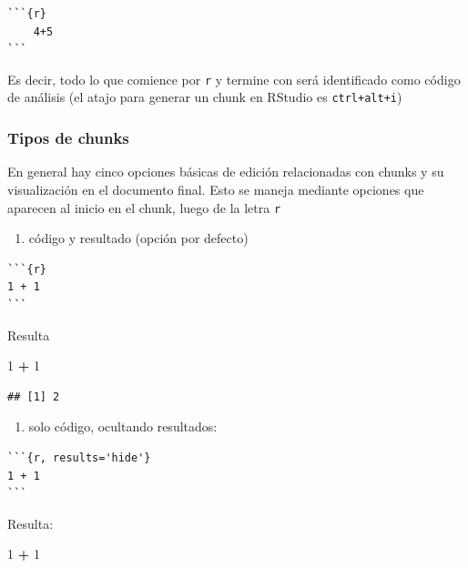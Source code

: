 \documentclass[11pt,]{book}
\newenvironment{Shaded}{\begin{snugshade}}{\end{snugshade}}
\newcommand{\DecValTok}[1]{\textcolor[rgb]{0.00,0.00,0.81}{#1}}
\newcommand{\OperatorTok}[1]{\textcolor[rgb]{0.81,0.36,0.00}{\textbf{#1}}}
\newcommand{\StringTok}[1]{\textcolor[rgb]{0.31,0.60,0.02}{#1}}
\providecommand{\tightlist}{%
  \setlength{\itemsep}{0pt}\setlength{\parskip}{0pt}}
\begin{document}
\begin{verbatim}
```{r}
    4+5
```
\end{verbatim}

Es decir, todo lo que comience por \texttt{\textasciigrave{}\textasciigrave{}\textasciigrave{}r} y termine con \texttt{\textasciigrave{}\textasciigrave{}\textasciigrave{}} será identificado como código de análisis (el atajo para generar un chunk en RStudio es \texttt{ctrl+alt+i})

\hypertarget{tipos-de-chunks}{%
\subsubsection{Tipos de chunks}\label{tipos-de-chunks}}

En general hay cinco opciones básicas de edición relacionadas con chunks y su visualización en el documento final. Esto se maneja mediante opciones que aparecen al inicio en el chunk, luego de la letra \texttt{r}

\begin{enumerate}
\def\labelenumi{\arabic{enumi}.}
\tightlist
\item
  código y resultado (opción por defecto)
\end{enumerate}

\begin{verbatim}
```{r}
1 + 1
```
\end{verbatim}

Resulta

\begin{Shaded}
\begin{Highlighting}[]
\DecValTok{1} \OperatorTok{+}\StringTok{ }\DecValTok{1}
\end{Highlighting}
\end{Shaded}

\begin{verbatim}
## [1] 2
\end{verbatim}

\begin{enumerate}
\def\labelenumi{\arabic{enumi}.}
\setcounter{enumi}{1}
\tightlist
\item
  solo código, ocultando resultados:
\end{enumerate}

\begin{verbatim}
```{r, results='hide'}
1 + 1
```
\end{verbatim}

Resulta:

\begin{Shaded}
\begin{Highlighting}[]
\DecValTok{1} \OperatorTok{+}\StringTok{ }\DecValTok{1}
\end{Highlighting}
\end{Shaded}
\end{document}
